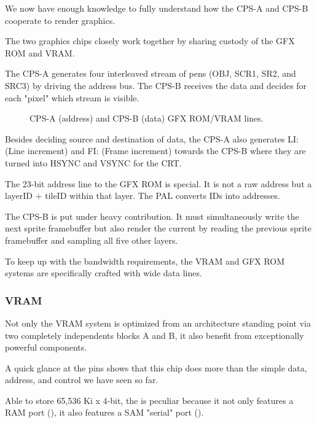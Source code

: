 We now have enough knowledge to fully understand how the CPS-A and CPS-B cooperate to render graphics.

The two graphics chips closely work together by sharing custody of the GFX ROM and VRAM. 


 The CPS-A generates four interleaved stream of pens (OBJ, SCR1, SR2, and SRC3) by driving the address bus.
  The CPS-B receives the data and decides for each "pixel" which stream is visible. 


\begin{figure}[H]
\caption*{CPS-A (address) and CPS-B (data) GFX ROM/VRAM lines.}
\end{figure}

Besides deciding source and destination of data, the CPS-A also generates LI: (Line increment) and FI: (Frame increment) towards the CPS-B where they are turned into HSYNC and VSYNC for the CRT.

The 23-bit address line to the GFX ROM is special. It is not a raw address but a layerID + tileID within that layer. The PAL  converts IDs into addresses.


The CPS-B is put under heavy contribution. It must simultaneously write the next sprite framebuffer but also render the current by reading the previous sprite framebuffer and sampling all five other layers.


To keep up with the bandwidth requirements, the VRAM and GFX ROM systems are specifically crafted with wide data lines.








\subsubsection{VRAM}
Not only the VRAM system is optimized from an architecture standing point via two completely independents blocks A and B, it also benefit from exceptionally powerful components.

A quick glance at the  pins shows that this chip does more than the simple data, address, and control we have seen so far.


Able to store 65,536 Ki x 4-bit, the  is peculiar because it not only features a RAM port (), it also features a SAM "serial" port ().
 
